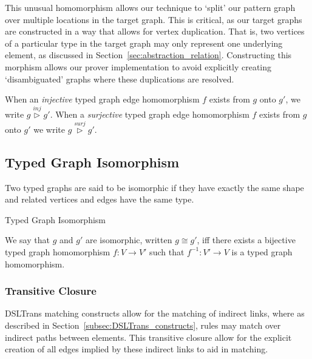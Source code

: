 This unusual homomorphism allows our technique to `split' our pattern graph over multiple locations in the target graph. This is critical, as our target graphs are constructed in a way that allows for vertex duplication. That is, two vertices of a particular type in the target graph may only represent one underlying element, as discussed in Section~\ref{sec:abstraction_relation}. Constructing this morphism allows our prover implementation to avoid explicitly creating `disambiguated' graphs where these duplications are resolved.

 When an \emph{injective} typed graph edge homomorphism $f$ exists from $g$ onto $g'$, we write $g \stackrel{inj}{\vartriangleright} g'$. When a \emph{surjective} typed graph edge homomorphism $f$ exists from $g$ onto $g'$ we write $g \stackrel{surj}{\vartriangleright} g'$.



\subsection*{Typed Graph Isomorphism}
Two typed graphs are said to be isomorphic if they have exactly the same shape and related vertices and edges have the same type.


\begin{definition}{Typed Graph Isomorphism\\}
\label{def:typed_graph_isomorphism}

We say that $g$ and $g'$ are isomorphic, written $g\cong g'$, iff there exists a bijective typed graph homomorphism $f:V\rightarrow V'$ such that $f^{-1}:V'\rightarrow V$ is a typed graph homomorphism.
\end{definition}




\subsubsection*{Transitive Closure}

DSLTrans matching constructs allow for the matching of indirect links, where as described in Section~\ref{subsec:DSLTrans_constructs}, rules may match over indirect paths between elements. This transitive closure allow for the explicit creation of all edges implied by these indirect links to aid in matching.


